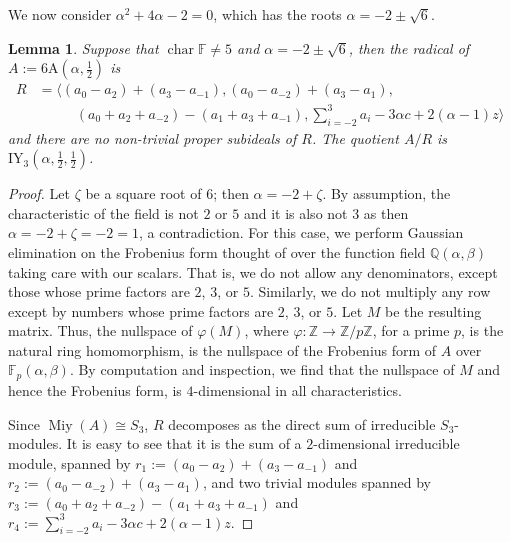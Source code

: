 \documentclass[11pt, a4paper]{article}
\theoremstyle{plain}
\newtheorem{lemma}[theorem]{Lemma}
\theoremstyle{definition}
\newcommand\al{\alpha}
\newcommand\bt{\beta}
\newcommand\la{\langle}
\newcommand\ra{\rangle}
\DeclareMathOperator{\ch}{char}
\newcommand\Q{\mathbb{Q}}
\newcommand\Z{\mathbb{Z}}
\newcommand\FF{\mathbb{F}}
\newcommand{\A}{\mathrm{A}}
\newcommand{\IY}{\mathrm{IY}}
\DeclareMathOperator{\Miy}{Miy}
\newcommand{\0}{\overline{0}}
\newcommand{\2}{\overline{2}}
\renewcommand{\phi}{\varphi}
\newcommand{\1}{\mathbbm{1}}
\begin{document}
We now consider $\al^2+4\al-2=0$, which has the roots $\al = -2 \pm \sqrt{6}$.

\begin{lemma}\label{6Aideal sqrt6}
Suppose that $\ch \FF \neq 5$ and $\al = -2 \pm \sqrt{6}$, then the radical of $A := 6\A(\al, \frac{1}{2})$ is
\begin{align*}
	R &= \la (a_0 -a_2)+(a_3-a_{-1}), (a_0 - a_{-2}) +  (a_3-a_1), \\
	&\phantom{{}={} \la} \quad (a_0 + a_2 + a_{-2}) - (a_1 + a_3 + a_{-1}), \sum_{i=-2}^3 a_i -3\al c +2(\al-1)z \ra
\end{align*}
and there are no non-trivial proper subideals of $R$.  The quotient $A/R$ is $\IY_3(\al, \frac{1}{2}, \frac{1}{2})$.
\end{lemma}
\begin{proof}
Let $\zeta$ be a square root of $6$; then $\al = -2+\zeta$.   By assumption, the characteristic of the field is not $2$ or $5$ and it is also not $3$ as then $\al = -2 + \zeta = -2 = 1$, a contradiction.  For this case, we perform Gaussian elimination on the Frobenius form thought of over the function field $\Q(\al, \bt)$ taking care with our scalars.  That is, we do not allow any denominators, except those whose prime factors are $2$, $3$, or $5$.  Similarly, we do not multiply any row except by numbers whose prime factors are $2$, $3$, or $5$.  Let $M$ be the resulting matrix.  Thus, the nullspace of $\phi(M)$, where $\phi \colon \Z \to \Z/p\Z$, for a prime $p$, is the natural ring homomorphism, is the nullspace of the Frobenius form of $A$ over $\FF_p(\al, \bt)$.  By computation and inspection, we find that the nullspace of $M$ and hence the Frobenius form, is $4$-dimensional in all characteristics.

Since $\Miy(A) \cong S_3$, $R$ decomposes as the direct sum of irreducible $S_3$-modules.  It is easy to see that it is the sum of a $2$-dimensional irreducible module, spanned by  $r_1 := (a_0 -a_2)+(a_3-a_{-1})$ and $r_2 := (a_0 - a_{-2}) +  (a_3-a_1)$, and two trivial modules spanned by $r_3 :=(a_0 + a_2 + a_{-2}) - (a_1 + a_3 + a_{-1})$ and $r_4  :=  \sum_{i=-2}^3 a_i -3\al c +2(\al-1)z$.


\end{proof}
\end{document}
